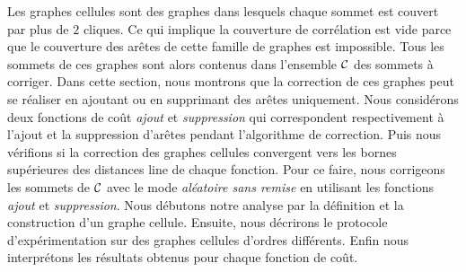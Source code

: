 Les graphes cellules sont des graphes dans lesquels chaque sommet est couvert par plus de $2$ cliques. Ce qui implique la couverture de corr\'elation est vide parce que  le couverture des ar\^etes de cette famille de graphes  est impossible. Tous les sommets de ces graphes sont alors contenus dans l'ensemble ${\cal C}$ des sommets \`a corriger.
\newline
Dans cette section, nous montrons que la correction de ces graphes peut se r\'ealiser en ajoutant ou en supprimant des ar\^etes uniquement.
Nous consid\'erons deux fonctions de co\^ut {\em ajout} et {\em suppression} qui correspondent respectivement \`a l'ajout et la suppression d'ar\^etes pendant l'algorithme de correction. Puis nous v\'erifions si la correction des graphes cellules convergent vers les bornes sup\'erieures des distances line de chaque fonction. 
Pour ce faire, nous corrigeons les sommets de  ${\cal C}$ avec le mode {\em al\'eatoire sans remise} en utilisant les fonctions {\em ajout} et {\em suppression}.
\newline
Nous d\'ebutons notre analyse par la d\'efinition et la construction d'un graphe cellule. Ensuite, nous d\'ecrirons le protocole d'exp\'erimentation sur des graphes cellules d'ordres diff\'erents. Enfin nous interpr\'etons les r\'esultats obtenus pour chaque fonction de co\^ut.